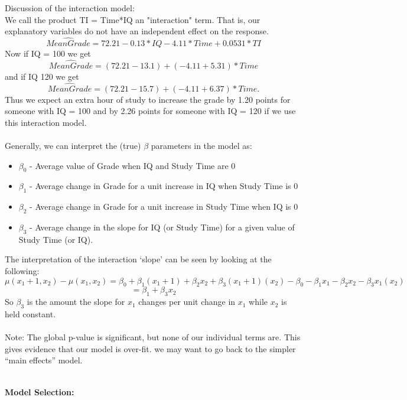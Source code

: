 \newpage

Discussion of the interaction model:\\
 We call the product TI = Time*IQ an "interaction" term. That is, our explanatory variables do not have an independent effect on the response.
$$ \widehat{Mean Grade} = 72.21 - 0.13*IQ - 4.11*Time + 0.0531*TI$$ 
Now if IQ = 100 we get
$$ \widehat{Mean Grade} = (72.21 - 13.1) + (- 4.11 + 5.31)*Time$$
and if IQ  120 we get
$$ \widehat{Mean Grade} = (72.21 - 15.7) + (- 4.11 + 6.37)*Time.$$
Thus we expect an extra hour of study to increase the grade by 1.20 points for someone with IQ = 100 and by 2.26 points for someone with IQ = 120 if we use this interaction model.\\~\\
Generally, we can interpret the (true) $\beta$ parameters in the model as:
\begin{itemize}
\item $\beta_0$ - Average value of Grade when IQ and Study Time are 0
\item $\beta_1$ - Average change in Grade for a unit increase in IQ when Study Time is 0
\item $\beta_2$ - Average change in Grade for a unit increase in Study Time when IQ is 0
\item $\beta_3$ - Average change in the slope for IQ (or Study Time) for a given value of Study Time (or IQ).
\end{itemize}
The interpretation of the interaction `slope' can be seen by looking at the following:
$$\mu(x_1+1,x_2)-\mu(x_1,x_2)=\beta_0+\beta_1(x_1+1)+\beta_2x_2+\beta_3(x_1+1)(x_2)-\beta_0-\beta_1x_1-\beta_2x_2-\beta_3x_1(x_2)$$
$$=\beta_1+\beta_3x_2$$
So $\beta_3$ is the amount the slope for $x_1$ changes per unit change in $x_1$ while $x_2$ is held constant.\\~\\

Note:  The global p-value is significant, but none of our individual terms are.   This gives evidence that our model is over-fit.  we may want to go back to the simpler ``main effects'' model.  \\~\\

\newpage

\textbf{Model Selection:}\\

